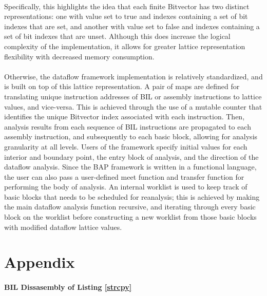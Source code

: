 \documentclass[letterpaper,11pt]{article}
\begin{document}
\paragraph{}
Specifically, this highlights the idea that each finite Bitvector has two
distinct representations: one with value set to true and indexes containing a
set of bit indexes that are set, and another with value set to false and
indexes containing a set of bit indexes that are unset. Although this does
increase the logical complexity of the implementation, it allows for greater
lattice representation flexibility with decreased memory consumption.

\paragraph{}
Otherwise, the dataflow framework implementation is relatively standardized,
and is built on top of this lattice representation. A pair of maps are defined
for translating unique instruction addresses of BIL or assembly instructions to
lattice values, and vice-versa. This is achieved through the use of a mutable
counter that identifies the unique Bitvector index associated with each
instruction. Then, analysis results from each sequence of BIL instructions are
propagated to each assembly instruction, and subsequently to each basic block,
allowing for analysis granularity at all levels. Users of the framework specify
initial values for each interior and boundary point, the entry block of
analysis, and the direction of the dataflow analysis. Since the BAP framework
is written in a functional language, the user can also pass a user-defined meet
function and transfer function for performing the body of analysis. An internal
worklist is used to keep track of basic blocks that needs to be scheduled for
reanalysis; this is achieved by making the main dataflow analysis function
recursive, and iterating through every basic block on the worklist before
constructing a new worklist from those basic blocks with modified dataflow
lattice values.

\section{Appendix}
\label{appa2}
\paragraph{BIL Dissasembly of Listing \ref{strcpy}}
\end{document}
